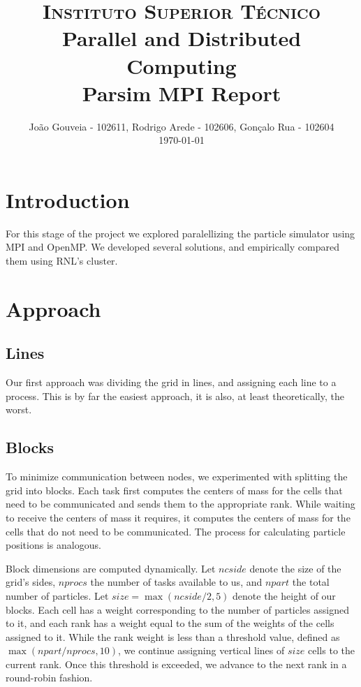 \documentclass[paper=a4, fontsize=11pt]{scrartcl}
\title{
    \usefont{OT1}{bch}{b}{n}
    \normalfont \normalsize \textsc{Instituto Superior Técnico} \\ [25pt]
    \huge Parallel and Distributed Computing \\ Parsim MPI Report
}
\author{
    \normalfont \normalsize
    João Gouveia - 102611, Rodrigo Arede - 102606, Gonçalo Rua - 102604 \\[-3pt] \normalsize
    \today
}
\date{}
\numberwithin{equation}{section} %
\numberwithin{figure}{section}   %
\numberwithin{table}{section}    %
\begin{document}
\maketitle
\section{Introduction}

For this stage of the project we explored paralellizing the particle simulator
using MPI and OpenMP. We developed several solutions, and empirically compared
them using RNL's cluster.

\section{Approach}
\subsection{Lines}

Our first approach was dividing the grid in lines, and assigning each line to a
process. This is by far the easiest approach, it is also, at least
theoretically, the worst.

\subsection{Blocks}

To minimize communication between nodes, we experimented with splitting the grid
into blocks. Each task first computes the centers of mass for the cells that
need to be communicated and sends them to the appropriate rank. While waiting to
receive the centers of mass it requires, it computes the centers of mass for the
cells that do not need to be communicated. The process for calculating particle
positions is analogous.

Block dimensions are computed dynamically. Let $ncside$ denote the size of the
grid's sides, $nprocs$ the number of tasks available to us, and $npart$ the
total number of particles. Let $size = \max(ncside / 2, 5)$ denote the height of
our blocks. Each cell has a weight corresponding to the number of particles
assigned to it, and each rank has a weight equal to the sum of the weights of
the cells assigned to it. While the rank weight is less than a threshold value,
defined as $\max(npart / nprocs, 10)$, we continue assigning vertical lines of
$size$ cells to the current rank. Once this threshold is exceeded, we advance to
the next rank in a round-robin fashion.
\end{document}
